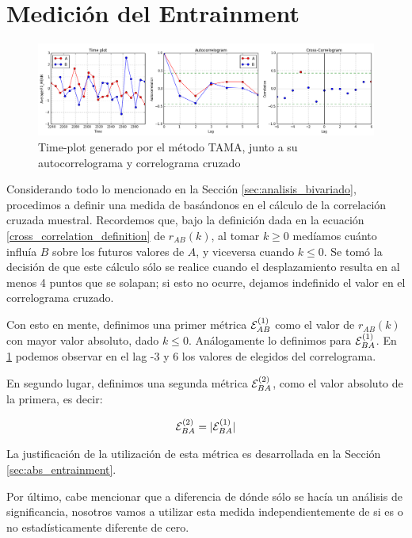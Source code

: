 \section{Medición del Entrainment}
\label{sec:method_entrainment}

\begin{figure}
\centering
\includegraphics[width=15cm]{images/time_plot_with_cross_correlation.png}
\caption{Time-plot generado por el método TAMA, junto a su autocorrelograma y correlograma cruzado}
\label{fig:time_plot_with_bivariate}
\end{figure}

Considerando todo lo mencionado en la Sección \ref{sec:analisis_bivariado}, procedimos a definir una medida de \entrainment basándonos en el cálculo de la correlación cruzada muestral. Recordemos que, bajo la definición dada en la ecuación \ref{cross_correlation_definition} de $r_{AB}(k)$, al tomar $k \geq 0$ medíamos cuánto influía $B$ sobre los futuros valores de $A$, y viceversa cuando $k \leq 0$. Se tomó la decisión de que este cálculo sólo se realice cuando el desplazamiento resulta en al menos 4 puntos que se solapan; si esto no ocurre, dejamos indefinido el valor en el correlograma cruzado.

Con esto en mente, definimos una primer métrica $\mathcal{E}_{AB}^{(1)}$ como el valor de $r_{AB}(k)$ con mayor valor absoluto, dado $k \leq 0$. Análogamente lo definimos para $\mathcal{E}_{BA}^{(1)}$. En \ref{fig:time_plot_with_bivariate} podemos observar en el lag -3 y 6 los valores de \entrainment elegidos del correlograma.

En segundo lugar, definimos una segunda métrica $\mathcal{E}_{BA}^{(2)}$, como el valor absoluto de la primera, es decir:

\begin{equation}
\mathcal{E}_{BA}^{(2)} = |\mathcal{E}_{BA}^{(1)}|
\end{equation}

La justificación de la utilización de esta métrica es desarrollada en la Sección \ref{sec:abs_entrainment}.

Por último, cabe mencionar que a diferencia de \cite{KOU2008.2} dónde sólo se hacía un análisis de significancia, nosotros vamos a utilizar esta medida independientemente de si es o no estadísticamente diferente de cero.
